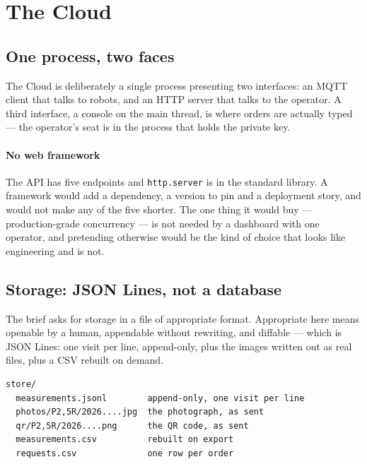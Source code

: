 \section{The Cloud}
\label{sec:phaseC_cloud}

\subsection{One process, two faces}

The Cloud is deliberately a single process presenting two interfaces: an
MQTT client that talks to robots, and an HTTP server that talks to the
operator. A third interface, a console on the main thread, is where
orders are actually typed --- the operator's seat is in the process that
holds the private key.

\paragraph{No web framework} The API has five endpoints and
\texttt{http.server} is in the standard library. A framework would add a
dependency, a version to pin and a deployment story, and would not make
any of the five shorter. The one thing it would buy --- production-grade
concurrency --- is not needed by a dashboard with one operator, and
pretending otherwise would be the kind of choice that looks like
engineering and is not.

\subsection{Storage: JSON Lines, not a database}

The brief asks for storage in a file of appropriate format. Appropriate
here means openable by a human, appendable without rewriting, and
diffable --- which is JSON Lines: one visit per line, append-only, plus
the images written out as real files, plus a CSV rebuilt on demand.

\begin{lstlisting}[style=bash]
store/
  measurements.jsonl        append-only, one visit per line
  photos/P2,5R/2026....jpg  the photograph, as sent
  qr/P2,5R/2026....png      the QR code, as sent
  measurements.csv          rebuilt on export
  requests.csv              one row per order
\end{lstlisting}

